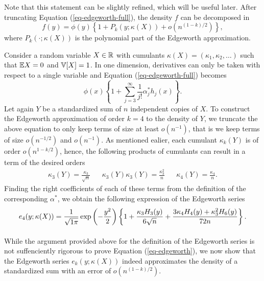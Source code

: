 Note that this statement can be slightly refined, which will be useful later. After truncating Equation (\ref{eq-edgeworth-full}), the density $f$ can be decomposed in
\begin{equation} \label{eq-edge-polynomial}
    f(y) = \phi(y)\left\{1 + P_k(y; \kappa(X)) + o(n^{(1-k)/2})\right\},
\end{equation}
where $P_k(\cdot; \kappa(X))$ is the polynomial part of the Edgeworth approximation.

\begin{example} \label{ex-edgeworth-1d}
    Consider a random variable $X \in \mathbb{R}$ with cumulants $\kappa(X) = (\kappa_1, \kappa_2, \ldots)$ such that $\mathbb{E}{X} = 0$ and $\mathbb{V}[X] = 1$. In one dimension, derivatives can only be taken with respect to a single variable and Equation (\ref{eq-edgeworth-full}) becomes
    \begin{equation*}
        \phi(x) \left\{
            1 + \sum_{j=3}^\infty  \frac{1}{j!}\alpha^*_j h_j(x)
        \right\}.
    \end{equation*}
    Let again $Y$ be a standardized sum of $n$ independent copies of $X$. To construct the Edgeworth approximation of order $k = 4$ to the density of $Y$, we truncate the above equation to only keep terms of size at least $o(n^{-1})$, that is we keep terms of size $o(n^{-1/2})$ and $o(n^{-1})$. As mentioned ealier, each cumulant $\kappa_k(Y)$ is of order $o(n^{1-k/2})$, hence, the following products of cumulants can result in a term of the desired orders
    \begin{align*}
        \kappa_3(Y) = \frac{\kappa_3}{\sqrt{n}} && \kappa_3(Y)\kappa_3(Y) = \frac{\kappa_3^2}{n} && \kappa_4(Y) = \frac{\kappa_4}{n}.
    \end{align*}
    Finding the right coefficients of each of these terms from the definition of the corresponding $\alpha^*$, we obtain the following expression of the Edgeworth series
    \begin{equation} \label{eq-edgeworth-1d-4}
        e_4(y; \kappa(X)) = \frac{1}{\sqrt{1\pi}}\exp\left(-\frac{y^2}{2}\right)\left\{1 + \frac{\kappa_3 H_3(y)}{6\sqrt{n}} + \frac{3\kappa_4 H_4(y) + \kappa_3^2 H_6(y)}{72 n}\right\}.
    \end{equation}
\end{example}

\paragraph{} While the argument provided above for the definition of the Edgeworth series is not suffenciently rigorous to prove Equation (\ref{eq-edgeworth}), we now show that the Edgeworth series $e_k(y; \kappa(X))$ indeed approximates the density of a standardized sum with an error of $o(n^{(1-k)/2})$.

